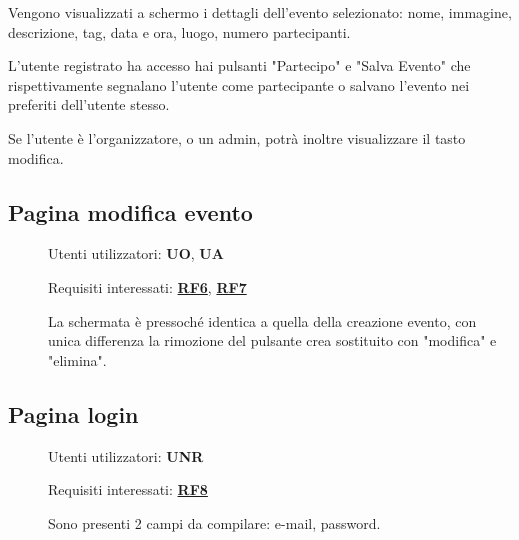\documentclass{article}
\begin{document}
\begin{description}
\begin{center}
        \end{center}
    \item[] Vengono visualizzati a schermo i dettagli dell'evento selezionato: nome, immagine, descrizione, tag, data e ora, luogo, numero partecipanti.
    \item[] L'utente registrato ha accesso hai pulsanti "Partecipo" e "Salva Evento" che rispettivamente segnalano l'utente come partecipante o salvano l'evento nei preferiti dell'utente stesso.
    \item[] Se l'utente è l'organizzatore, o un admin, potrà inoltre visualizzare il tasto modifica.
\end{description}
\clearpage
\subsection{Pagina modifica evento}
\begin{description}
    \item[] Utenti utilizzatori: \textbf{UO}, \textbf{UA}
    \item[] Requisiti interessati: \hyperref[rf_6]{\textbf{RF6}}, \hyperref[rf_7]{\textbf{RF7}}
    \item[] La schermata è pressoché identica a quella della creazione evento, con unica differenza la rimozione del pulsante crea sostituito con "modifica" e "elimina".
\end{description}
\subsection{Pagina login}
\begin{description}
    \item[] Utenti utilizzatori: \textbf{UNR}
    \item[] Requisiti interessati: \hyperref[rf_8]{\textbf{RF8}}
    \item[] Sono presenti 2 campi da compilare: e-mail, password.
\end{description}
\clearpage
\end{document}
